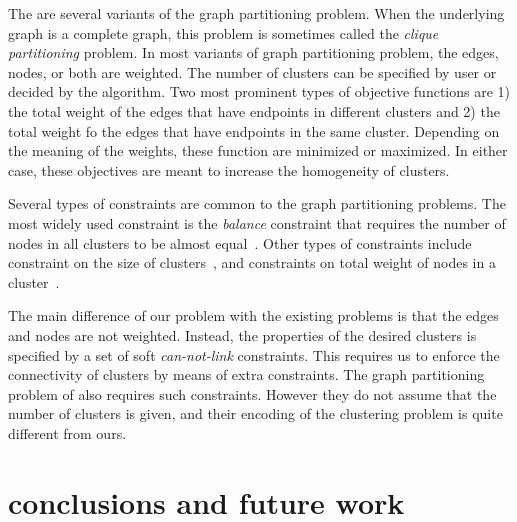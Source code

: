 \documentclass[conference,compsoc]{IEEEtran}
\begin{document}
The are several variants of the graph partitioning problem. When the underlying graph is a complete graph, this problem is sometimes called the \emph{clique partitioning} problem. In most variants of graph partitioning problem, the edges, nodes, or both are weighted. The number of clusters can be specified by user or decided by the algorithm. Two most prominent types of objective functions are 1) the total weight of the edges that have endpoints in different clusters and 2) the total weight fo the edges that have endpoints in the same cluster. Depending on the meaning of the weights, these function are minimized or maximized. In either case, these objectives are meant to increase the homogeneity of clusters.  

Several types of constraints are common to the graph partitioning problems. The most widely used constraint is the \emph{balance} constraint that requires the number of nodes in all clusters to be almost equal~\cite{LabbeO10}. Other types of constraints include constraint on the size of clusters~\cite{FanP10}, and constraints on total weight of nodes in a cluster~\cite{FerreiraMSWW98}. 

The main difference of our problem with the existing problems is that the edges and nodes are not weighted. Instead, the properties of the desired clusters is specified by a set of soft \emph{can-not-link} constraints. This requires us to enforce the connectivity of clusters by means of extra constraints. The graph partitioning problem of \cite{Benati2017} also requires such constraints. However they do not assume that the number of clusters is given, and their encoding of the clustering problem is quite different from ours. 


\section{conclusions and future work}
\label{sec:conclusion}



\end{document}
